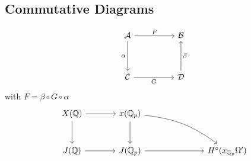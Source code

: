 \documentclass[12pt]{article}
\begin{document}
\subsection{Commutative Diagrams}
\[
    \begin{tikzcd}[column sep=huge, row sep=huge]
        \mathcal{A} \arrow[r, "F"] \arrow[d, "\alpha"'] & \mathcal{B} \\
        \mathcal{C} \arrow[r, "G"'] & \mathcal{D} \arrow[u, "\beta"']
    \end{tikzcd}
\]
with $F=\beta\circ G\circ\alpha$
\ex{

}
    \[
        \begin{tikzcd}[column sep=large, row sep=large]
            X(\Q) \arrow[r, ] \arrow[d, ] & x(\Q_p) \arrow[d, ] & & \\
            J(\Q) \arrow[r, ] & J(\Q_p) \arrow[rr, ] & & H^\circ(x_{\Q_p}\Omega')
            \arrow[from=1-2, to=2-4, , bend left=15]
        \end{tikzcd}
    \]
\end{document}

